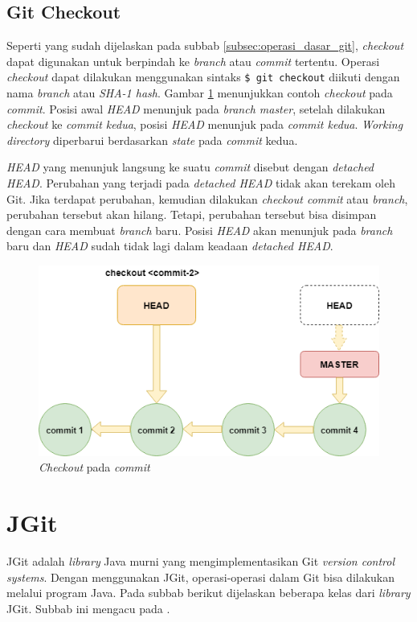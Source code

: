\subsection{Git Checkout}
\label{subsec:git_checkout}
Seperti yang sudah dijelaskan pada subbab \ref{subsec:operasi_dasar_git}, \textit{checkout} dapat digunakan untuk berpindah ke \textit{branch} atau \textit{commit} tertentu. Operasi \textit{checkout} dapat dilakukan menggunakan sintaks \texttt{\$ git checkout} diikuti dengan nama \textit{branch} atau \textit{SHA-1 hash}. Gambar \ref{fig:git_checkout} menunjukkan contoh \textit{checkout} pada \textit{commit}. Posisi awal \textit{HEAD} menunjuk pada \textit{branch master}, setelah dilakukan \textit{checkout} ke \textit{commit kedua}, posisi \textit{HEAD} menunjuk pada \textit{commit kedua}. \textit{Working directory} diperbarui berdasarkan \textit{state} pada \textit{commit} kedua. 

\textit{HEAD} yang menunjuk langsung ke suatu \textit{commit} disebut dengan \textit{detached HEAD}. Perubahan yang terjadi pada \textit{detached HEAD} tidak akan terekam oleh Git. Jika terdapat perubahan, kemudian dilakukan \textit{checkout commit} atau \textit{branch}, perubahan tersebut akan hilang. Tetapi, perubahan tersebut bisa disimpan dengan cara membuat \textit{branch} baru. Posisi \textit{HEAD} akan menunjuk pada \textit{branch} baru dan \textit{HEAD} sudah tidak lagi dalam keadaan \textit{detached HEAD}. 
\begin{figure}[H]
	\centering
		\includegraphics[scale=0.6]{Gambar/gitcheckoutcommit.png}
	\caption{\textit{Checkout} pada \textit{commit}}
	\label{fig:git_checkout}
\end{figure}

\section{JGit}
\label{sec:jgit}
JGit adalah \textit{library} Java murni yang mengimplementasikan Git \textit{version control systems}\cite{JGit}. Dengan menggunakan JGit, operasi-operasi dalam Git bisa dilakukan melalui program Java. Pada subbab berikut dijelaskan beberapa kelas dari \textit{library} JGit. Subbab ini mengacu pada \cite{JGit_java_doc}. 

